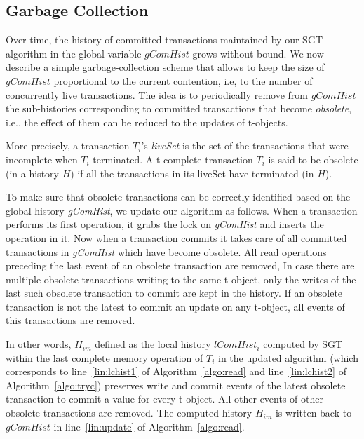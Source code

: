 \documentclass{llncs}
\newcommand{\cmnt}[1]{}
\newcommand{\id}[1]{\mbox{\textit{#1}}}\newcommand{\res}[1]{\mbox{\textbf{#1}}}
\newcommand{\gchist} {\textit{gComHist}}
\newcommand{\lchist} {\textit{lComHist}}
\newcommand{\sgt} {SGT}
\newcommand{\memop} {memory operation}
\newcommand{\liveset} {liveSet}
\newcommand{\primary} {primary}
\newcommand{\glset} {gIncSet}
\newcommand{\waits} {waitSet}
\newcommand{\dset} {dependSet}
\newcommand{\sstate} {system-state}
\newcommand{\obsolete} {obsolete}
\begin{document}
\subsection{Garbage Collection}
\label{subsec:garbage}

\cmnt {
\newcommand{\liveset} {\id{liveSet}}
\newcommand{\primary} {primary}
\newcommand{\glset} {gIncSet}
\newcommand{\waits} {waitSet}
\newcommand{\dset} {dependSet}
\newcommand{\sstate} {system-state}
}

Over time, the history of committed transactions maintained by our \sgt{}
algorithm in the global variable  $\gchist$ grows
without bound. We now describe a simple garbage-collection
scheme that allows to keep the size of $\gchist$ proportional to the
current contention, i.e, to the number of concurrently live transactions.
The idea is to periodically remove from $\gchist$ the sub-histories
corresponding to committed transactions that become \emph{obsolete}, i.e.,
the effect of them can be reduced to the updates of t-objects.


More precisely, a transaction $T_i$'s \emph{\liveset} is the set of
the transactions that were incomplete when $T_i$ terminated. 
A t-complete transaction $T_i$ is said to be \obsolete{} (in a history $H$) if all the transactions 
in its \liveset{} have terminated (in $H$).

To make sure that obsolete transactions can be correctly identified
based on the global history {\gchist}, we update our algorithm as
follows. When a transaction performs its first operation, it grabs the
lock on {\gchist} and inserts the operation in it. 
Now when a transaction commits it takes care of all committed
transactions in \gchist{} which have become
\obsolete. 
All read operations preceding the last event of an  {\obsolete}
transaction are removed,   
In case there are multiple \obsolete{} transactions writing to the
same t-object, only the writes of the last such {\obsolete}
transaction to commit are kept in the history.
If an {\obsolete} transaction is not the latest to commit an update on
any t-object, all events of this transactions are removed.   


In other words, $H_{im}$ defined as the local history $\lchist_i$ computed
by \sgt{} within the last complete \memop{} of $T_i$ in the updated algorithm
(which corresponds to line~\ref{lin:lchist1} of Algorithm~\ref{algo:read} and
line~\ref{lin:lchist2} of Algorithm~\ref{algo:tryc}) preserves write
and commit events of the  latest {\obsolete} transaction to commit a
value for every t-object. All other events of other {\obsolete} transactions
are removed.
The computed history $H_{im}$ is written back to  $\gchist$ in line~\ref{lin:update} of Algorithm~\ref{algo:read}.   
\end{document}
